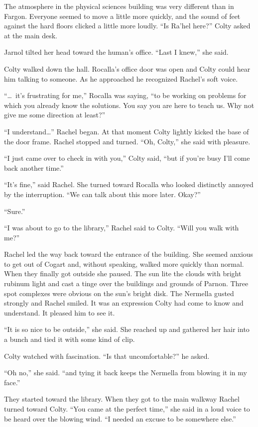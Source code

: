 The atmosphere in the physical sciences building was very different than in Fargon. Everyone
seemed to move a little more quickly, and the sound of feet against the hard floors clicked a
little more loudly. ``Is Ra'hel here?'' Colty asked at the main desk.

Jarnol tilted her head toward the human's office. ``Last I knew,'' she said.

Colty walked down the hall. Rocalla's office door was open and Colty could hear him talking to
someone. As he approached he recognized Rachel's soft voice.

``\ldots\ it's frustrating for me,'' Rocalla was saying, ``to be working on problems for which
you already know the solutions. You say you are here to teach us. Why not give me some direction
at least?''

``I understand\ldots'' Rachel began. At that moment Colty lightly kicked the base of the door
frame. Rachel stopped and turned. ``Oh, Colty,'' she said with pleasure.

``I just came over to check in with you,'' Colty said, ``but if you're busy I'll come back
another time.''

``It's fine,'' said Rachel. She turned toward Rocalla who looked distinctly annoyed by the
interruption. ``We can talk about this more later. Okay?''

``Sure.''

``I was about to go to the library,'' Rachel said to Colty. ``Will you walk with me?''

Rachel led the way back toward the entrance of the building. She seemed anxious to get out of
Cogart and, without speaking, walked more quickly than normal. When they finally got outside she
paused. The sun lite the clouds with bright rubinum light and cast a tinge over the buildings
and grounds of Parnon. Three spot complexes were obvious on the sun's bright disk. The Nermella
gusted strongly and Rachel smiled. It was an expression Colty had come to know and understand.
It pleased him to see it.

``It is so nice to be outside,'' she said. She reached up and gathered her hair into a bunch and
tied it with some kind of clip.

Colty watched with fascination. ``Is that uncomfortable?'' he asked.

``Oh no,'' she said. ``and tying it back keeps the Nermella from blowing it in my face.''

They started toward the library. When they got to the main walkway Rachel turned toward Colty.
``You came at the perfect time,'' she said in a loud voice to be heard over the blowing wind.
``I needed an excuse to be somewhere else.''

